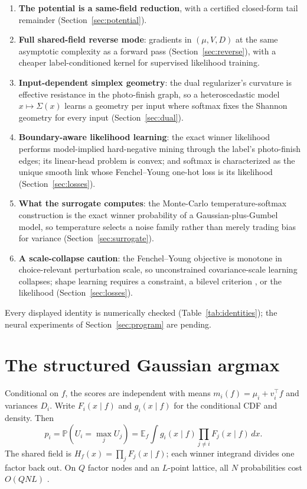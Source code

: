 \documentclass[11pt]{article}
\theoremstyle{remark}
\newcommand{\E}{\mathbb{E}}
\newcommand{\Prob}{\mathbb{P}}
\begin{document}
\begin{enumerate}
\item \textbf{The potential is a same-field reduction}, with a
certified closed-form tail remainder (Section~\ref{sec:potential}).
\item \textbf{Full shared-field reverse mode}: gradients in
$(\mu, V, D)$ at the same asymptotic complexity as a forward pass
(Section~\ref{sec:reverse}), with a cheaper label-conditioned kernel
for supervised likelihood training.
\item \textbf{Input-dependent simplex geometry}: the dual regularizer's
curvature is effective resistance in the photo-finish graph, so a
heteroscedastic model $x \mapsto \Sigma(x)$ learns a geometry per
input where softmax fixes the Shannon geometry for every input
(Section~\ref{sec:dual}).
\item \textbf{Boundary-aware likelihood learning}: the exact winner
likelihood performs model-implied hard-negative mining through the
label's photo-finish edges; its linear-head problem is convex; and
softmax is characterized as the unique smooth link whose
Fenchel--Young one-hot loss is its likelihood
(Section~\ref{sec:losses}).
\item \textbf{What the surrogate computes}: the Monte-Carlo
temperature-softmax construction is the exact winner probability of a
Gaussian-plus-Gumbel model, so temperature selects a noise family
rather than merely trading bias for variance
(Section~\ref{sec:surrogate}).
\item \textbf{A scale-collapse caution}: the Fenchel--Young objective is
monotone in choice-relevant perturbation scale, so unconstrained
covariance-scale learning collapses; shape learning requires a
constraint, a bilevel criterion \citep{lin2026}, or the likelihood
(Section~\ref{sec:losses}).
\end{enumerate}

Every displayed identity is numerically checked
(Table~\ref{tab:identities}); the neural experiments of
Section~\ref{sec:program} are pending.

\section{The structured Gaussian argmax}

Conditional on $f$, the scores are independent with means
$m_i(f) = \mu_i + v_i^\top f$ and variances $D_i$. Write $F_i(x \mid f)$
and $g_i(x \mid f)$ for the conditional CDF and density. Then
\[
p_i = \Prob(U_i = \max_j U_j)
= \E_f \int g_i(x \mid f) \prod_{j \ne i} F_j(x \mid f)\, dx .
\]
The shared field is $H_f(x) = \prod_j F_j(x \mid f)$; each winner
integrand divides one factor back out. On $Q$ factor nodes and an
$L$-point lattice, all $N$ probabilities cost $O(QNL)$
\citep{cotton2026}.
\end{document}

